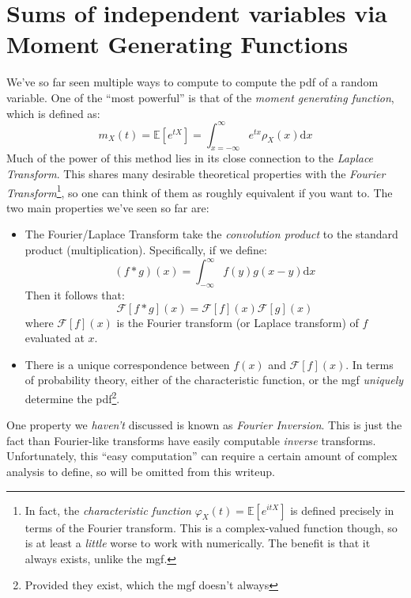 \documentclass{article}
\begin{document}
\section{Sums of independent variables via Moment Generating Functions}
We've so far seen multiple ways to compute to compute the pdf of a random variable.
One of the ``most powerful'' is that of the \emph{moment generating function}, which is defined as:
\begin{equation}
m_X(t) = \mathbb{E}[e^{tX}] = \int_{x = -\infty}^\infty e^{tx}\rho_X(x)\mathrm{ d}x
\end{equation}
Much of the power of this method lies in its close connection to the \emph{Laplace Transform}.
This shares many desirable theoretical properties with the \emph{Fourier Transform}\footnote{In fact, the \emph{characteristic function} $\varphi_X(t) = \mathbb{E}[e^{itX}]$ is defined precisely in terms of the Fourier transform.
This is a complex-valued function though, so is at least a \emph{little} worse to work with numerically.
The benefit is that it always exists, unlike the mgf.}, so one can think of them as roughly equivalent if you want to.
The two main properties we've seen so far are:
\begin{itemize}
\item The Fourier/Laplace Transform take the \emph{convolution product} to the standard product (multiplication).
Specifically, if we define:
\begin{equation}
(f\ast g)(x) = \int_{-\infty}^\infty f(y)g(x-y)\mathrm{ d}x
\end{equation}
Then it follows that:
\begin{equation}
\mathcal{F}[f\ast g](x) = \mathcal{F}[f](x)\mathcal{F}[g](x)
\end{equation}
where $\mathcal{F}[f](x)$ is the Fourier transform (or Laplace transform) of $f$ evaluated at $x$.
\item 
There is a unique correspondence between $f(x)$ and $\mathcal{F}[f](x)$.
In terms of probability theory, either of the characteristic function, or the mgf \emph{uniquely} determine the pdf\footnote{Provided they exist, which the mgf doesn't always}.
\end{itemize}
One property we \emph{haven't} discussed is known as \emph{Fourier Inversion}.
This is just the fact than Fourier-like transforms have easily computable \emph{inverse} transforms.
Unfortunately, this ``easy computation'' can require a certain amount of complex analysis to define, so will be omitted from this writeup.
\end{document}
